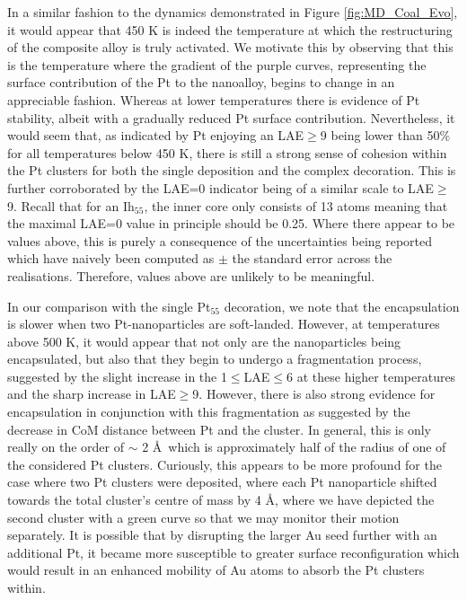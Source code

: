 In a similar fashion to the dynamics demonstrated in Figure \ref{fig:MD_Coal_Evo}, it would appear that 450 K is indeed the temperature at which the restructuring of the composite alloy is truly activated. We motivate this by observing that this is the temperature where the gradient of the purple curves, representing the surface contribution of the Pt to the nanoalloy, begins to change in an appreciable fashion. Whereas at lower temperatures there is evidence of Pt stability, albeit with a gradually reduced Pt surface contribution. Nevertheless, it would seem that, as indicated by Pt enjoying an LAE$\geq$9 being lower than 50\% for all temperatures below 450 K, there is still a strong sense of cohesion within the Pt clusters for both the single deposition and the complex decoration. This is further corroborated by the LAE=0 indicator being of a similar scale to LAE$\geq$9. Recall that for an Ih$_{55}$, the inner core only consists of 13 atoms meaning that the maximal LAE=0 value in principle should be 0.25. Where there appear to be values above, this is purely a consequence of the uncertainties being reported which have naively been computed as $\pm$ the standard error across the realisations. Therefore, values above are unlikely to be meaningful.

In our comparison with the single Pt$_{55}$ decoration, we note that the encapsulation is slower when two Pt-nanoparticles are soft-landed. However, at temperatures above 500 K, it would appear that not only are the nanoparticles being encapsulated, but also that they begin to undergo a fragmentation process, suggested by the slight increase in the 1$\leq$LAE$\leq$6 at these higher temperatures and the sharp increase in LAE$\geq$9. However, there is also strong evidence for encapsulation in conjunction with this fragmentation as suggested by the decrease in CoM distance between Pt and the cluster. In general, this is only really on the order of $\sim$ 2 \AA \, which is approximately half of the radius of one of the considered Pt clusters. Curiously, this appears to be more profound for the case where two Pt clusters were deposited, where each Pt nanoparticle shifted towards the total cluster's centre of mass by 4 \AA, where we have depicted the second cluster with a green curve so that we may monitor their motion separately. It is possible that by disrupting the larger Au seed further with an additional Pt, it became more susceptible to greater surface reconfiguration which would result in an enhanced mobility of Au atoms to absorb the Pt clusters within. 

